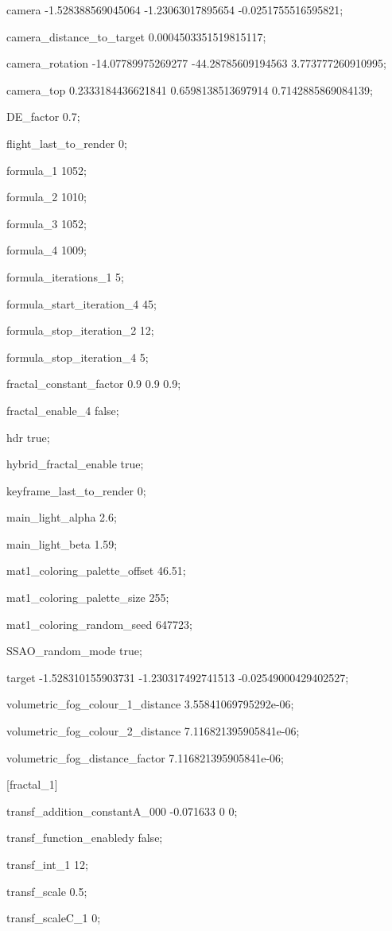 camera -1.528388569045064 -1.23063017895654 -0.0251755516595821;

camera\_distance\_to\_target 0.0004503351519815117;

camera\_rotation -14.07789975269277 -44.28785609194563 3.773777260910995;

camera\_top 0.2333184436621841 0.6598138513697914 0.7142885869084139;

DE\_factor 0.7;

flight\_last\_to\_render 0;

formula\_1 1052;

formula\_2 1010;

formula\_3 1052;

formula\_4 1009;

formula\_iterations\_1 5;

formula\_start\_iteration\_4 45;

formula\_stop\_iteration\_2 12;

formula\_stop\_iteration\_4 5;

fractal\_constant\_factor 0.9 0.9 0.9;

fractal\_enable\_4 false;

hdr true;

hybrid\_fractal\_enable true;

keyframe\_last\_to\_render 0;

main\_light\_alpha 2.6;

main\_light\_beta 1.59;

mat1\_coloring\_palette\_offset 46.51;

mat1\_coloring\_palette\_size 255;

mat1\_coloring\_random\_seed 647723;

SSAO\_random\_mode true;

target -1.528310155903731 -1.230317492741513 -0.02549000429402527;

volumetric\_fog\_colour\_1\_distance 3.55841069795292e-06;

volumetric\_fog\_colour\_2\_distance 7.116821395905841e-06;

volumetric\_fog\_distance\_factor 7.116821395905841e-06;

{[}fractal\_1{]}

transf\_addition\_constantA\_000 -0.071633 0 0;

transf\_function\_enabledy false;

transf\_int\_1 12;

transf\_scale 0.5;

transf\_scaleC\_1 0;

